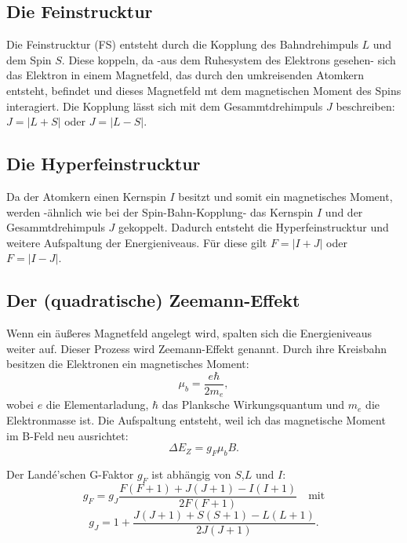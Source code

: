 \subsection{Die Feinstrucktur}
\noindent Die Feinstrucktur (FS) entsteht durch die Kopplung des Bahndrehimpuls $L$ 
und dem Spin $S$. 
Diese koppeln, da 
-aus dem Ruhesystem des Elektrons gesehen-
sich das Elektron in einem Magnetfeld, 
das durch den umkreisenden Atomkern entsteht, befindet
und dieses Magnetfeld mt dem magnetischen Moment des Spins interagiert.
Die Kopplung lässt sich mit dem Gesammtdrehimpuls $J$ beschreiben:
$J= | L + S |$ 
oder 
$J= | L - S |$.

\subsection{Die Hyperfeinstrucktur}
\noindent Da der Atomkern einen Kernspin $I$ besitzt und somit ein magnetisches Moment,
werden -ähnlich wie bei der Spin-Bahn-Kopplung-
das Kernspin $I$ und der Gesammtdrehimpuls $J$ gekoppelt.
Dadurch entsteht die Hyperfeinstrucktur und weitere Aufspaltung der Energieniveaus.
Für diese gilt $F= | I + J |$ oder $F= | I - J|$.

\subsection{Der (quadratische) Zeemann-Effekt}
\noindent Wenn ein äußeres Magnetfeld angelegt wird, 
spalten sich die Energieniveaus weiter auf.
Dieser Prozess wird Zeemann-Effekt genannt.
Durch ihre Kreisbahn besitzen die Elektronen ein magnetisches Moment:
\begin{equation}
    \mu_b = \frac{e \hbar}{2 m_e},
\end{equation}
\noindent wobei $e$ die Elementarladung,
$\hbar$ das Planksche Wirkungsquantum und
$m_e$ die Elektronmasse ist.
Die Aufspaltung entsteht, 
weil ich das magnetische Moment im B-Feld neu ausrichtet:
\begin{equation}
   \Delta E_Z = g_F \mu_b B.
\end{equation}

\noindent Der Landé’schen G-Faktor $g_F$ ist abhängig 
von $S$,$L$ und $I$:
\begin{equation}
    g_F= g_J \frac{F \left( F + 1 \right) + J \left( J + 1 \right) 
    - I \left( I + 1 \right)}
    {2 F \left( F + 1 \right)}  \quad \text{mit}
\end{equation}
\begin{equation}
    g_J = 1 + \frac{J \left( J + 1 \right) + S \left( S + 1 \right) 
    - L \left( L + 1 \right)}
    {2 J \left( J + 1 \right)}.
\end{equation}

